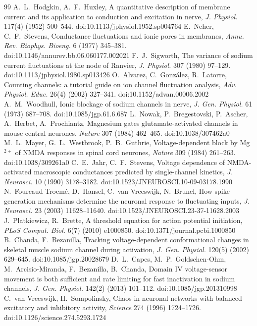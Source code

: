 \documentclass[11pt]{article}
\theoremstyle{definition}\newtheorem{definition}[theorem]{Definition}
\theoremstyle{remark}\newtheorem{remark}[theorem]{Remark}
\begin{document}
\begin{thebibliography}{99}\small
{} A.~L.~Hodgkin, A.~F.~Huxley, A quantitative description of membrane current and its application to conduction and excitation in nerve, \emph{J. Physiol.} 117(4) (1952) 500--544. doi:10.1113/jphysiol.1952.sp004764
 E.~Neher, C.~F.~Stevens, Conductance fluctuations and ionic pores in membranes, \emph{Annu. Rev. Biophys. Bioeng.} 6 (1977) 345--381. doi:10.1146/annurev.bb.06.060177.002021
 F.~J.~Sigworth, The variance of sodium current fluctuations at the node of Ranvier, \emph{J. Physiol.} 307 (1980) 97--129. doi:10.1113/jphysiol.1980.sp013426
 O.~Alvarez, C.~Gonz\'alez, R.~Latorre, Counting channels: a tutorial guide on ion channel fluctuation analysis, \emph{Adv. Physiol. Educ.} 26(4) (2002) 327--341. doi:10.1152/advan.00006.2002
 A.~M.~Woodhull, Ionic blockage of sodium channels in nerve, \emph{J. Gen. Physiol.} 61 (1973) 687--708. doi:10.1085/jgp.61.6.687
 L.~Nowak, P.~Bregestovski, P.~Ascher, A.~Herbet, A.~Prochiantz, Magnesium gates glutamate-activated channels in mouse central neurones, \emph{Nature} 307 (1984) 462--465. doi:10.1038/307462a0
 M.~L.~Mayer, G.~L.~Westbrook, P.~B.~Guthrie, Voltage-dependent block by Mg$^{2+}$ of NMDA responses in spinal cord neurones, \emph{Nature} 309 (1984) 261--263. doi:10.1038/309261a0
 C.~E.~Jahr, C.~F.~Stevens, Voltage dependence of NMDA-activated macroscopic conductances predicted by single-channel kinetics, \emph{J. Neurosci.} 10 (1990) 3178--3182. doi:10.1523/JNEUROSCI.10-09-03178.1990
 N.~Fourcaud-Trocm\'e, D.~Hansel, C.~van Vreeswijk, N.~Brunel, How spike generation mechanisms determine the neuronal response to fluctuating inputs, \emph{J. Neurosci.} 23 (2003) 11628--11640. doi:10.1523/JNEUROSCI.23-37-11628.2003
 J.~Platkiewicz, R.~Brette, A threshold equation for action potential initiation, \emph{PLoS Comput. Biol.} 6(7) (2010) e1000850. doi:10.1371/journal.pcbi.1000850
 B.~Chanda, F.~Bezanilla, Tracking voltage-dependent conformational changes in skeletal muscle sodium channel during activation, \emph{J. Gen. Physiol.} 120(5) (2002) 629--645. doi:10.1085/jgp.20028679
 D.~L.~Capes, M.~P.~Goldschen-Ohm, M.~Arcisio-Miranda, F.~Bezanilla, B.~Chanda, Domain IV voltage-sensor movement is both sufficient and rate limiting for fast inactivation in sodium channels, \emph{J. Gen. Physiol.} 142(2) (2013) 101--112. doi:10.1085/jgp.201310998
 C.~van Vreeswijk, H.~Sompolinsky, Chaos in neuronal networks with balanced excitatory and inhibitory activity, \emph{Science} 274 (1996) 1724--1726. doi:10.1126/science.274.5293.1724

\end{thebibliography}
\end{document}
